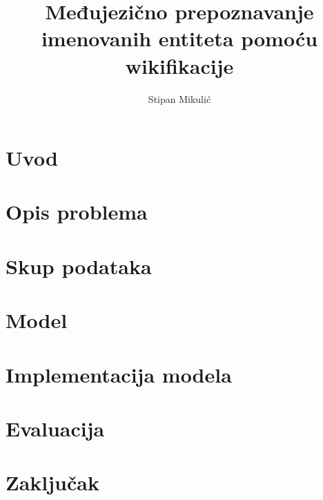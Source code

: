 \documentclass[times, utf8, seminar]{fer}
\begin{document}
\title{Međujezično prepoznavanje imenovanih entiteta pomoću wikifikacije}

\author{Stipan Mikulić}

\maketitle

\tableofcontents

\chapter{Uvod}


\newpage

\chapter{Opis problema}

\chapter{Skup podataka}

\chapter{Model}

\chapter{Implementacija modela}

\chapter{Evaluacija}

\chapter{Zaključak}





\nocite{*}

\begin{sazetak}


\kljucnerijeci{}
\end{sazetak}
\begin{abstract}


\keywords{}
\end{abstract}
\end{document}
